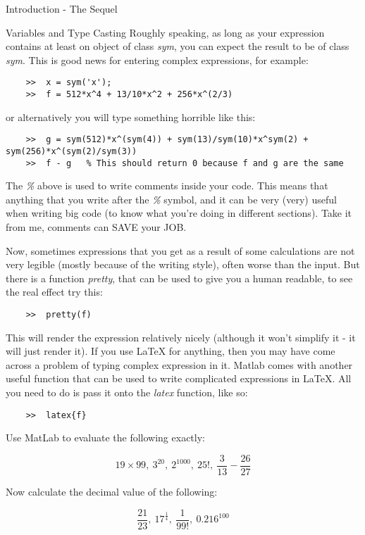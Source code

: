 \documentclass[11pt, oneside]{report}   	%
\begin{document}
\begin{chapter}{Introduction - The Sequel}
\begin{section}{Variables and Type Casting}
Roughly speaking, as long as your expression contains at least on object of class \textit{sym}, you can expect the
result to be of class \textit{sym}. This is good news for entering complex expressions, for example:

\begin{lstlisting}
	>>	x = sym('x');
	>>	f = 512*x^4 + 13/10*x^2 + 256*x^(2/3)
\end{lstlisting}
or alternatively you will type something horrible like this:
\begin{lstlisting}
	>>	g = sym(512)*x^(sym(4)) + sym(13)/sym(10)*x^sym(2) + sym(256)*x^(sym(2)/sym(3))
	>>	f - g 	% This should return 0 because f and g are the same
\end{lstlisting}
The \textit{\%} above is used to write comments inside your code. This means that anything that you write after the
\textit{\%} symbol, and it can be very (very) useful when writing big code (to know what you're doing in different
sections). Take it from me, comments can SAVE your JOB.

Now, sometimes expressions that you get as a result of some calculations are not very legible (mostly because of
the writing style), often worse than the input. But there is a function \textit{pretty}, that can be used to give you a
human readable, to see the real effect try this:

\begin{lstlisting}
	>>	pretty(f)
\end{lstlisting}
This will render the expression relatively nicely (although it won't simplify it - it will just render it). If you use \LaTeX 
for anything, then you may have come across a problem of typing complex expression in it. Matlab comes with
another useful function that can be used to write complicated expressions in \LaTeX. All you need to do is pass it
onto the \textit{latex} function, like so:

\begin{lstlisting}
	>>	latex{f}
\end{lstlisting}
 
 \begin{Exercise}

Use MatLab to evaluate the following exactly:

\[ 19 \times 99, \ 3^{20}, \ 2^{1000}, \ 25!, \ \frac{3}{13} - \frac{26}{27} \]

	Now calculate the decimal value of the following:

\[ \frac{21}{23}, \ 17^{\frac{1}{4}}, \ \frac{1}{99!}, \ 0.216^{100} \]
 

\end{Exercise}
\end{section}
\end{chapter}
\end{document}
